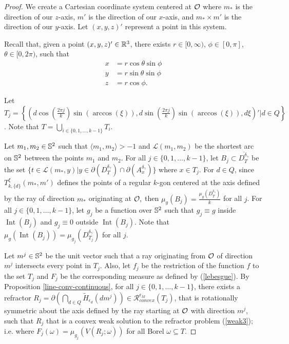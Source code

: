 \documentclass[review]{elsarticle}
\DeclareMathOperator*{\Int}{Int}
\begin{document}
\begin{proof}
 We create a Cartesian coordinate system centered at $\mathcal{O}$ where $m_*$ is the direction of our $z$-axis, $m'$ is the direction of our $x$-axis, and $m_*\times m'$ is the direction of our $y$-axis. Let $(x,y,z)'$ represent a point in this system. 

Recall that, given a point $(x,y,z)'\in \mathbb{R}^3$, there exists $r \in [0, \infty)$, $\phi \in [0, \pi]$, $\theta \in [0, 2\pi)$, such that
\begin{align}
    x&=r\cos\theta \sin\phi\\
    y&=r\sin\theta\sin\phi\\
    z&=r\cos\phi.
\end{align}

Let $T_j= \left\{\left(d\cos\left(\frac{2\pi j}k\right)\sin\left(\arccos(\xi)\right),d\sin\left(\frac{2\pi j}k\right)\sin\left(\arccos(\xi)\right),d\xi\right)'|d\in Q\right\}$. Note that $T=\bigcup_{i\in \{0,1,\dots,k-1\}} T_i.$

    Let $m_1,m_2\in\mathbb{S}^2$ such that $\langle m_1,m_2\rangle >-1$ and $\mathscr{L}(m_1,m_2)$ be the shortest arc on $\mathbb{S}^2$ between the points $m_1$ and $m_2$. For all $j\in \{0,1,\dots,k-1\}$, let $B_j\subset \overline{D_T^{\delta_\gamma}}$ be the set $\{t\in\mathscr{L}(m_*,y)|y\in \partial(D_T^{\delta_\gamma})\cap\partial(A_x^{\delta_\gamma})\}$ where $x\in T_j$. For $d\in Q$, since $T_{k,\{d\}}^\xi(m_*,m')$ defines the points of a regular $k$-gon centered at the axis defined by the ray of direction $m_*$ originating at $\mathcal{O},$ then $\mu_g(B_j)=\frac{\mu_g(D_T^{\delta_\gamma})}k$ for all $j$. For all $j\in \{0,1,\dots,k-1\}$, let $g_j$ be a function over $\mathbb{S}^2$ such that $g_j\equiv g$ inside $\Int(B_j)$ and $g_j\equiv 0$ outside $\Int(B_j)$. Note that $\mu_g(\Int(B_j))=\mu_{g_j}(D_{T_j}^{\delta_\gamma})$ for all $j$.
    
    Let $m^j\in \mathbb{S}^2$ be the unit vector such that a ray originating from $\mathcal{O}$ of direction $m^j$ intersects every point in $T_j.$ Also, let $f_j$ be the restriction of the function $f$ to the set $T_j$ and $F_j$ be the corresponding measure as defined by (\ref{lebesgue}). By Proposition \ref{line-conv-continuous}, for all $j\in \{0,1,\dots,k-1\}$, there exists a refractor $R_j=\partial\left(\bigcap_{d\in Q} \tilde{H}_{\epsilon_d}(dm^j)\right) \in\mathcal{R}_{convex}^{\epsilon_M} (T_j)$, that is rotationally symmetric about the axis defined by the ray starting at $\mathcal{O}$ with direction $m^j$, such that $R_j$ that is a convex weak solution to the refractor problem (\ref{weak3}); i.e. where $F_j(\omega) = \mu_{g_j}(V(R_j; \omega))$ for all Borel $\omega\subseteq T$. 
    

\end{proof}
\end{document}
